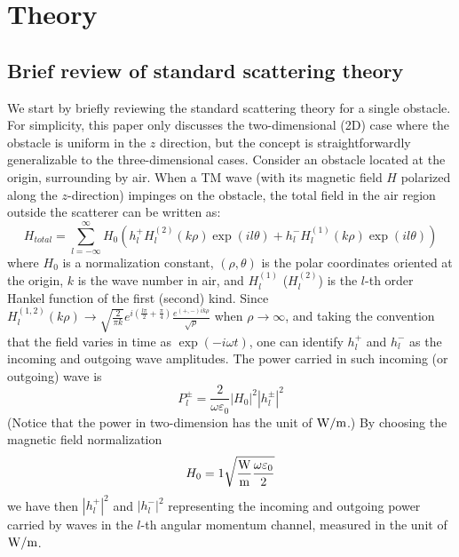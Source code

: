 \documentclass[preprint,aps]{revtex4}
\begin{document}
\section{Theory}
\subsection{Brief review of standard scattering theory}
We start by briefly reviewing the standard scattering theory for a
single obstacle. For simplicity, this paper only discusses  the
two-dimensional (2D) case where the obstacle is uniform in the $z$
direction, but the concept is straightforwardly generalizable to the
three-dimensional cases. Consider an obstacle located at the origin,
surrounding by air. When a TM wave (with its magnetic field $H$
polarized along the $z$-direction) impinges on the obstacle, the
total field in the air region outside the scatterer can be written
as:
\begin{equation}
   {{H_{total}}}= {\sum\limits_{l =  - \infty }^\infty  {H_0 \left( {h_l^ + H_l^{(2)}({k}\rho )\exp (il\theta ) + h_l^ - H_l^{(1)}({k}\rho )\exp (il\theta )} \right)} }
  \label{eq:total}
\end{equation}
where $H_0$ is a normalization constant, $(\rho,\theta)$ is the
polar coordinates oriented at the origin, $k$ is the wave number in
air, and $H_l^{(1)}$ ($H_l^{(2)}$) is the $l$-th order Hankel
function of the first (second) kind. Since $H_l^{(1,2)}(k\rho ) \to
\sqrt {\frac{2}{{\pi k}}} {e^{i(\frac{{l\pi }}{2} + \frac{\pi
}{4})}}\frac{{{e^{( + , - )ik\rho }}}}{{\sqrt \rho  }}$  when $\rho
\to \infty $, and taking the convention that the field varies in
time as $\exp(-i \omega t)$, one can identify $h_l^+$ and $h_l^-$ as
the incoming and outgoing wave amplitudes. The power carried in such
incoming (or outgoing) wave is
\begin{equation}
P_l^ \pm  = \frac{2 }{{\omega {\varepsilon _0}}}{\left| {{H_0}}
\right|^2}{\left| {h_l^ \pm } \right|^2}
\end{equation}
(Notice that the power in two-dimension has the unit of $\rm{W/m}$.)
By choosing the magnetic field normalization
\begin{equation} {H_0}
= 1\sqrt {\rm{{\frac{W}{m}}}\frac{{\omega {\varepsilon _0}}}{2 }}
\end{equation}
we have then $\left| {h_l^ + } \right|^2$ and $\left| {h_l^ - }
\right|^2$ representing the incoming and outgoing power carried by
waves in the $l$-th angular momentum channel, measured in the unit
of $\rm{W/m}$.
\end{document}
